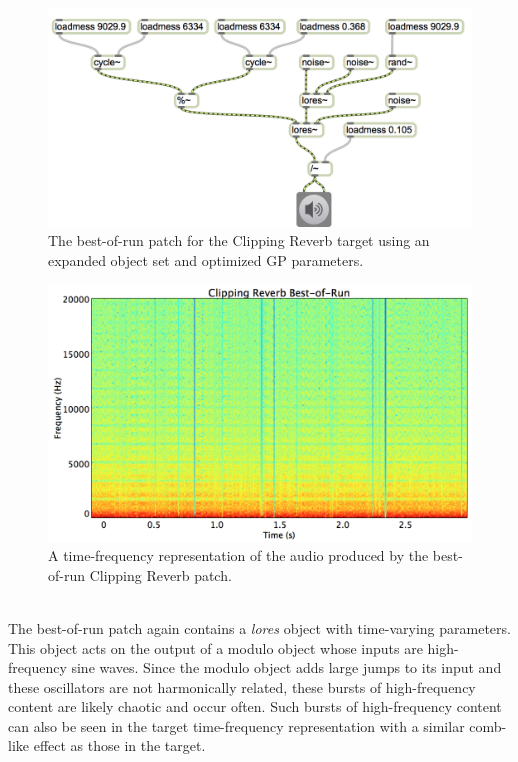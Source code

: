 \documentclass[a4paper,12pt]{report} 	%
\numberwithin{figure}{chapter}
\numberwithin{table}{chapter}
\numberwithin{equation}{chapter}
\begin{document}
\begin{flushleft}
\begin{figure}[h!]
\begin{center}
\includegraphics[width=\linewidth]{ClippingReverb_Best}
\caption[Clipping Reverb Best-of-Run Patch]{The best-of-run patch for the Clipping Reverb target using an expanded object set and optimized GP parameters.}
\end{center}
\end{figure}
\begin{figure}[h!]
\begin{center}
\includegraphics[scale=0.35,width=\linewidth]{ClippingReverbBestOfRunSTFT}
\caption[Best-of-Run Clipping Reverb Time-Frequency Representation]{A time-frequency representation of the audio produced by the best-of-run Clipping Reverb patch.}
\end{center}
\end{figure}
\\

The best-of-run patch again contains a \emph{lores\texttildelow{}} object with time-varying parameters. This object acts on the output of a modulo object whose inputs are high-frequency sine waves. Since the modulo object adds large jumps to its input and these oscillators are not harmonically related, these bursts of high-frequency content are likely chaotic and occur often. Such bursts of high-frequency content can also be seen in the target time-frequency representation with a similar comb-like effect as those in the target.


\end{flushleft}
\end{document}
